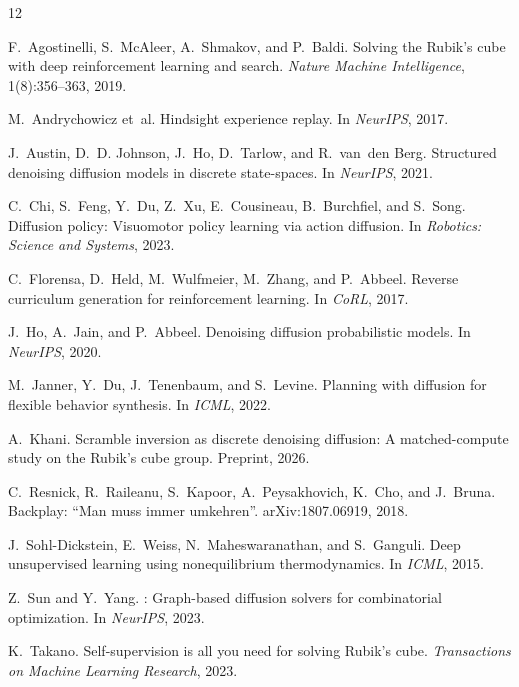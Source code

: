 \documentclass[11pt]{article}
\begin{document}

\begin{thebibliography}{12}

F.~Agostinelli, S.~McAleer, A.~Shmakov, and P.~Baldi.
\newblock Solving the {R}ubik's cube with deep reinforcement learning and search.
\newblock \emph{Nature Machine Intelligence}, 1(8):356--363, 2019.

M.~Andrychowicz et~al.
\newblock Hindsight experience replay.
\newblock In \emph{NeurIPS}, 2017.

J.~Austin, D.~D. Johnson, J.~Ho, D.~Tarlow, and R.~van~den Berg.
\newblock Structured denoising diffusion models in discrete state-spaces.
\newblock In \emph{NeurIPS}, 2021.

C.~Chi, S.~Feng, Y.~Du, Z.~Xu, E.~Cousineau, B.~Burchfiel, and S.~Song.
\newblock Diffusion policy: Visuomotor policy learning via action diffusion.
\newblock In \emph{Robotics: Science and Systems}, 2023.

C.~Florensa, D.~Held, M.~Wulfmeier, M.~Zhang, and P.~Abbeel.
\newblock Reverse curriculum generation for reinforcement learning.
\newblock In \emph{CoRL}, 2017.

J.~Ho, A.~Jain, and P.~Abbeel.
\newblock Denoising diffusion probabilistic models.
\newblock In \emph{NeurIPS}, 2020.

M.~Janner, Y.~Du, J.~Tenenbaum, and S.~Levine.
\newblock Planning with diffusion for flexible behavior synthesis.
\newblock In \emph{ICML}, 2022.

A.~Khani.
\newblock Scramble inversion as discrete denoising diffusion: A
matched-compute study on the {R}ubik's cube group.
\newblock Preprint, 2026.

C.~Resnick, R.~Raileanu, S.~Kapoor, A.~Peysakhovich, K.~Cho, and J.~Bruna.
\newblock Backplay: ``{M}an muss immer umkehren''.
\newblock arXiv:1807.06919, 2018.

J.~Sohl-Dickstein, E.~Weiss, N.~Maheswaranathan, and S.~Ganguli.
\newblock Deep unsupervised learning using nonequilibrium thermodynamics.
\newblock In \emph{ICML}, 2015.

Z.~Sun and Y.~Yang.
: Graph-based diffusion solvers for combinatorial optimization.
\newblock In \emph{NeurIPS}, 2023.

K.~Takano.
\newblock Self-supervision is all you need for solving {R}ubik's cube.
\newblock \emph{Transactions on Machine Learning Research}, 2023.

\end{thebibliography}
\end{document}

